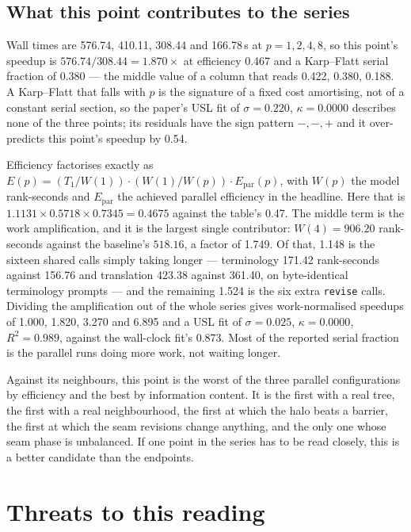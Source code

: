 \documentclass[11pt]{article}
\begin{document}
\subsection*{What this point contributes to the series}

Wall times are 576.74, 410.11, 308.44 and 166.78\,s at $p=1,2,4,8$, so this point's speedup is
$576.74/308.44 = 1.870\times$ at efficiency 0.467 and a Karp--Flatt serial fraction of 0.380 ---
the middle value of a column that reads 0.422, 0.380, 0.188. A Karp--Flatt that falls with $p$ is
the signature of a fixed cost amortising, not of a constant serial section, so the paper's USL
fit of $\sigma=0.220$, $\kappa=0.0000$ describes none of the three points; its residuals have the
sign pattern $-,-,+$ and it over-predicts this point's speedup by 0.54.

Efficiency factorises exactly as $E(p)=(T_1/W(1))\cdot(W(1)/W(p))\cdot E_{\mathrm{par}}(p)$, with
$W(p)$ the model rank-seconds and $E_{\mathrm{par}}$ the achieved parallel efficiency in the
headline. Here that is $1.1131\times0.5718\times0.7345=0.4675$ against the table's 0.47. The
middle term is the work amplification, and it is the largest single contributor: $W(4)=906.20$
rank-seconds against the baseline's $518.16$, a factor of 1.749. Of that, 1.148 is the sixteen
shared calls simply taking longer --- terminology 171.42 rank-seconds against 156.76 and
translation 423.38 against 361.40, on byte-identical terminology prompts --- and the remaining
1.524 is the six extra \texttt{revise} calls. Dividing the amplification out of the whole series gives work-normalised
speedups of 1.000, 1.820, 3.270 and 6.895 and a USL fit of $\sigma=0.025$, $\kappa=0.0000$,
$R^2=0.989$, against the wall-clock fit's 0.873. Most of the reported serial fraction is the
parallel runs doing more work, not waiting longer.

Against its neighbours, this point is the worst of the three parallel configurations by
efficiency and the best by information content. It is the first with a real tree, the first with
a real neighbourhood, the first at which the halo beats a barrier, the first at which the seam
revisions change anything, and the only one whose seam phase is unbalanced. If one point in the
series has to be read closely, this is a better candidate than the endpoints.

\section{Threats to this reading}
\end{document}
